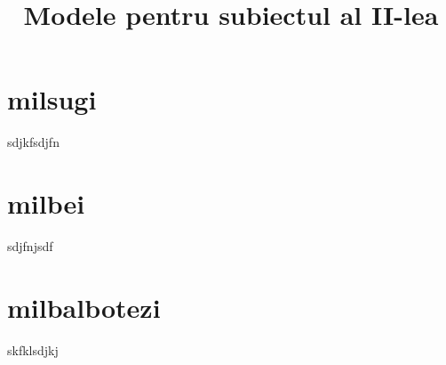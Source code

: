
\title{Modele pentru subiectul al II-lea}



\ApplySubIIStyling %
\maketitle         %
\tableofcontents   %
\clearpage

\section{milsugi}
sdjkfsdjfn

\section{milbei}
sdjfnjsdf

\section{milbalbotezi}
skfklsdjkj

